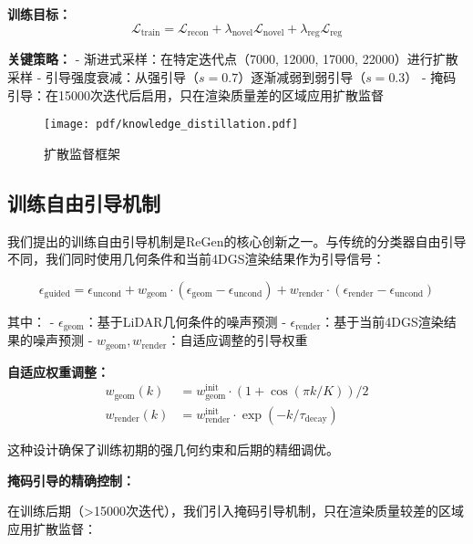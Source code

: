\textbf{训练目标：}
\begin{equation}
\mathcal{L}_{\text{train}} = \mathcal{L}_{\text{recon}} + \lambda_{\text{novel}} \mathcal{L}_{\text{novel}} + \lambda_{\text{reg}} \mathcal{L}_{\text{reg}}
\label{eq:diffusion_supervised_training}
\end{equation}

\textbf{关键策略：}
- 渐进式采样：在特定迭代点（7000, 12000, 17000, 22000）进行扩散采样
- 引导强度衰减：从强引导（$s=0.7$）逐渐减弱到弱引导（$s=0.3$）
- 掩码引导：在15000次迭代后启用，只在渲染质量差的区域应用扩散监督

\begin{figure}[htbp]
  \centering
  \texttt{[image: pdf/knowledge\_distillation.pdf]}
  \caption{扩散监督框架}
  \label{fig:diffusion-supervision}
\end{figure}

\subsection{训练自由引导机制}

我们提出的训练自由引导机制是ReGen的核心创新之一。与传统的分类器自由引导不同，我们同时使用几何条件和当前4DGS渲染结果作为引导信号：

\begin{equation}
\epsilon_{\text{guided}} = \epsilon_{\text{uncond}} + w_{\text{geom}} \cdot (\epsilon_{\text{geom}} - \epsilon_{\text{uncond}}) + w_{\text{render}} \cdot (\epsilon_{\text{render}} - \epsilon_{\text{uncond}})
\label{eq:dual_guidance}
\end{equation}

其中：
- $\epsilon_{\text{geom}}$：基于LiDAR几何条件的噪声预测
- $\epsilon_{\text{render}}$：基于当前4DGS渲染结果的噪声预测
- $w_{\text{geom}}, w_{\text{render}}$：自适应调整的引导权重

\textbf{自适应权重调整：}
\begin{align}
w_{\text{geom}}(k) &= w_{\text{geom}}^{\text{init}} \cdot (1 + \cos(\pi k / K)) / 2 \\
w_{\text{render}}(k) &= w_{\text{render}}^{\text{init}} \cdot \exp(-k / \tau_{\text{decay}})
\label{eq:adaptive_guidance_weights}
\end{align}

这种设计确保了训练初期的强几何约束和后期的精细调优。

\textbf{掩码引导的精确控制：}

在训练后期（>15000次迭代），我们引入掩码引导机制，只在渲染质量较差的区域应用扩散监督：


